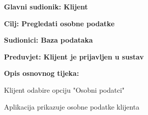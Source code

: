 					\noindent {}
					\begin{packed_item}
						
						\item \textbf{Glavni sudionik: Klijent}
						\item  \textbf{Cilj: Pregledati osobne podatke} 	
						\item  \textbf{Sudionici: Baza podataka}
						\item  \textbf{Preduvjet: Klijent je prijavljen u sustav}
						\item  \textbf{Opis osnovnog tijeka: }
						
						\item[] \begin{packed_enum}
							
							\item Klijent odabire opciju "Osobni podatci"
							\item Aplikacija prikazuje osobne podatke klijenta
						\end{packed_enum}
					
				\end{packed_item}
						
